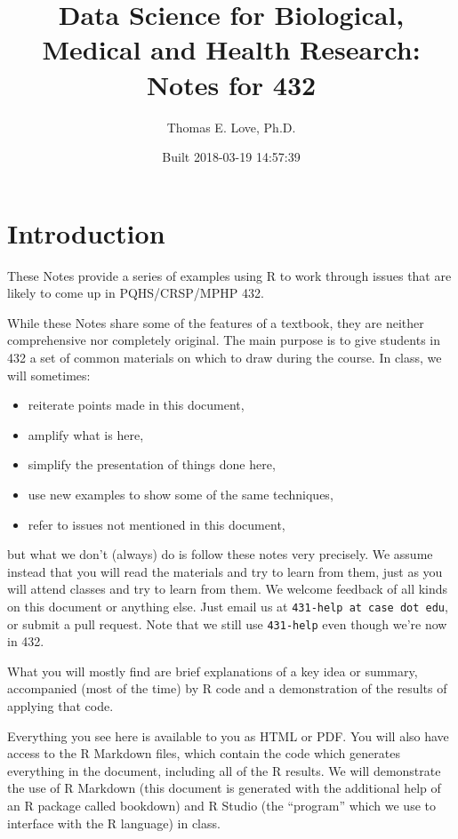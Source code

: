 \documentclass[]{book}
\title{Data Science for Biological, Medical and Health Research: Notes for 432}
\author{Thomas E. Love, Ph.D.}
\date{Built 2018-03-19 14:57:39}
\providecommand{\tightlist}{%
  \setlength{\itemsep}{0pt}\setlength{\parskip}{0pt}}
\theoremstyle{definition}
\theoremstyle{definition}
\theoremstyle{definition}
\theoremstyle{remark}
\begin{document}
\maketitle

{
\setcounter{tocdepth}{1}
\tableofcontents
}
\chapter*{Introduction}\label{introduction}

These Notes provide a series of examples using R to work through issues
that are likely to come up in PQHS/CRSP/MPHP 432.

While these Notes share some of the features of a textbook, they are
neither comprehensive nor completely original. The main purpose is to
give students in 432 a set of common materials on which to draw during
the course. In class, we will sometimes:

\begin{itemize}
\tightlist
\item
  reiterate points made in this document,
\item
  amplify what is here,
\item
  simplify the presentation of things done here,
\item
  use new examples to show some of the same techniques,
\item
  refer to issues not mentioned in this document,
\end{itemize}

but what we don't (always) do is follow these notes very precisely. We
assume instead that you will read the materials and try to learn from
them, just as you will attend classes and try to learn from them. We
welcome feedback of all kinds on this document or anything else. Just
email us at \texttt{431-help\ at\ case\ dot\ edu}, or submit a pull
request. Note that we still use \texttt{431-help} even though we're now
in 432.

What you will mostly find are brief explanations of a key idea or
summary, accompanied (most of the time) by R code and a demonstration of
the results of applying that code.

Everything you see here is available to you as HTML or PDF. You will
also have access to the R Markdown files, which contain the code which
generates everything in the document, including all of the R results. We
will demonstrate the use of R Markdown (this document is generated with
the additional help of an R package called bookdown) and R Studio (the
``program'' which we use to interface with the R language) in class.
\end{document}
